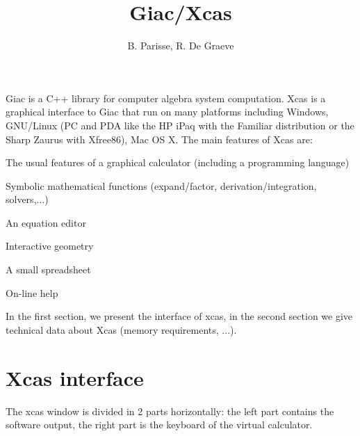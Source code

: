 \documentclass{article}
\begin{document}
\title{Giac/Xcas}\author{B. Parisse, R. De Graeve}\maketitle

Giac is a C++ library for computer algebra system computation. Xcas is a
graphical interface to Giac that run on many platforms including Windows,
GNU/Linux (PC and PDA like the HP iPaq with the Familiar distribution or the
Sharp Zaurus with Xfree86), Mac OS X. The main features of Xcas are:
\begin{enumeratenumeric}
  \item The usual features of a graphical calculator (including a programming
  language)
  
  \item Symbolic mathematical functions (expand/factor,
  derivation/integration, solvers,...)
  
  \item An equation editor
  
  \item Interactive geometry
  
  \item A small spreadsheet
  
  \item On-line help
\end{enumeratenumeric}


In the first section, we present the interface of xcas, in the second section
we give technical data about Xcas (memory requirements, ...).

\section{Xcas interface}

The xcas window is divided in 2 parts horizontally: the left part contains the
software output, the right part is the keyboard of the virtual calculator.

\end{document}
